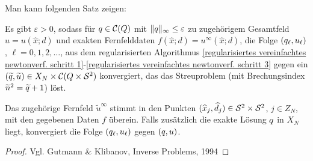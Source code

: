 Man kann folgenden Satz zeigen:
\begin{satz}
	Es gibt \(\varepsilon>0\), sodass für \(q\in\mathcal{C}(Q)\) mit \(\|q\|_\infty\leq\varepsilon\) zu zugehörigem Gesamtfeld \(u=u(\widehat{x};d)\) und exakten Fernfelddaten \(f(\widehat{x};d)=u^\infty(\widehat{x};d)\), die Folge \((q_\ell,u_\ell)\), \(\ell=0,1,2,\ldots\), aus dem regularisierten Algorithmus \ref{regularisiertes vereinfachtes newtonverf. schritt 1}-\ref{regularisiertes vereinfachtes newtonverf. schritt 3} gegen ein \((\widetilde{q},\widetilde{u})\in X_N\times\mathcal{C}(Q\times\mathcal{S}^2)\) konvergiert, das das Streuproblem (mit Brechungsindex \(\widetilde{n}^2=\widetilde{q}+1\)) löst. 
	
	Das zugehörige Fernfeld \(\widetilde{u}^\infty\) stimmt in den Punkten \((\widehat{x}_j,\widehat{d}_j)\in\mathcal{S}^2\times\mathcal{S}^2\), \(j\in Z_N\), mit den gegebenen Daten \(f\) überein. Falls zusätzlich die exakte Lösung \(q\) in \(X_N\) liegt, konvergiert die Folge \((q_\ell,u_\ell)\) gegen \((q,u)\).
\end{satz}
\begin{proof}
	Vgl. Gutmann \& Klibanov, Inverse Problems, 1994
\end{proof}



















